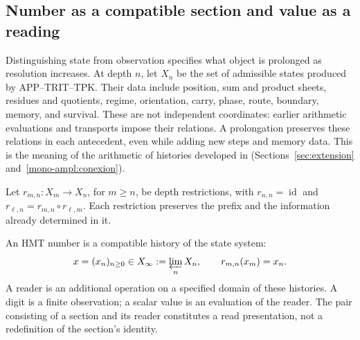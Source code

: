 
\subsection{Number as a compatible section and value as a reading}
\label{hist:seccion}

Distinguishing state from observation specifies what object is prolonged
as resolution increases. At depth \(n\), let \(X_n\) be the set of
admissible states produced by APP--TRIT--TPK. Their data include position,
sum and product sheets, residues and quotients, regime, orientation,
carry, phase, route, boundary, memory, and survival. These are not
independent coordinates: earlier arithmetic evaluations and transports
impose their relations. A prolongation preserves these relations in
each antecedent, even while adding new steps and memory data.
This is the meaning of the arithmetic of histories developed in
(Sections~\ref{sec:extension} and~\ref{mono-ampl:conexion}).

Let \(r_{m,n}:X_m\to X_n\), for \(m\geq n\), be depth
restrictions, with \(r_{n,n}=\operatorname{id}\) and
\(r_{\ell,n}=r_{m,n}\circ r_{\ell,m}\). Each restriction preserves
the prefix and the information already determined in it.

\begin{definition}
An HMT number is a compatible history of the state system:
\begin{equation}
 x=(x_n)_{n\geq0}\in X_\infty:=\varprojlim_n X_n,
 \qquad r_{m,n}(x_m)=x_n.
 \label{hist:limite-inverso}
\end{equation}
A reader is an additional operation on a specified domain of these
histories. A digit is a finite observation; a scalar value is an evaluation
of the reader. The pair consisting of a section and its reader constitutes
a read presentation, not a redefinition of the section's identity.
\end{definition}

